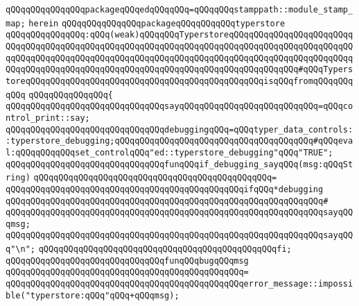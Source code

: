 \verb|qQQqqQQqqQQqqQQqpackageqQQqedqQQqqQQq=qQQqqQQqstamppath::module_stamp_map;|\newline
\verb|herein|\newline
\newline
\newline
\verb|qQQqqQQqqQQqqQQqpackageqQQqqQQqqQQqtyperstore|\newline
\verb|qQQqqQQqqQQqqQQq:qQQq(weak)qQQqqQQqTyperstoreqQQqqQQqqQQqqQQqqQQqqQQqqQQqqQQqqQQqqQQqqQQqqQQqqQQqqQQqqQQqqQQqqQQqqQQqqQQqqQQqqQQqqQQqqQQqqQQqqQQqqQQqqQQqqQQqqQQqqQQqqQQqqQQqqQQqqQQqqQQqqQQqqQQqqQQqqQQqqQQqqQQqqQQqqQQqqQQqqQQqqQQqqQQqqQQqqQQqqQQqqQQqqQQqqQQqqQQqqQQqqQQq#qQQqTyperstoreqQQqqQQqqQQqqQQqqQQqqQQqqQQqqQQqqQQqqQQqqQQqqQQqisqQQqfromqQQqqQQqqQQq|\newline
\verb|qQQqqQQqqQQqqQQq{|\newline
\verb|qQQqqQQqqQQqqQQqqQQqqQQqqQQqqQQqsayqQQqqQQqqQQqqQQqqQQqqQQqqQQq=qQQqcontrol_print::say;|\newline
\verb|qQQqqQQqqQQqqQQqqQQqqQQqqQQqqQQqdebuggingqQQq=qQQqtyper_data_controls::typerstore_debugging;qQQqqQQqqQQqqQQqqQQqqQQqqQQqqQQqqQQqqQQq#qQQqeval:qQQqqQQqqQQqset_controlqQQq"ed::typerstore_debugging"qQQq"TRUE";|\newline
\newline
\verb|qQQqqQQqqQQqqQQqqQQqqQQqqQQqqQQqfunqQQqif_debugging_sayqQQq(msg:qQQqString)|\newline
\verb|qQQqqQQqqQQqqQQqqQQqqQQqqQQqqQQqqQQqqQQqqQQqqQQq=|\newline
\verb|qQQqqQQqqQQqqQQqqQQqqQQqqQQqqQQqqQQqqQQqqQQqqQQqifqQQq*debugging|\newline
\verb|qQQqqQQqqQQqqQQqqQQqqQQqqQQqqQQqqQQqqQQqqQQqqQQqqQQqqQQqqQQqqQQq#|\newline
\verb|qQQqqQQqqQQqqQQqqQQqqQQqqQQqqQQqqQQqqQQqqQQqqQQqqQQqqQQqqQQqqQQqsayqQQqmsg;|\newline
\verb|qQQqqQQqqQQqqQQqqQQqqQQqqQQqqQQqqQQqqQQqqQQqqQQqqQQqqQQqqQQqqQQqsayqQQq"\n";|\newline
\verb|qQQqqQQqqQQqqQQqqQQqqQQqqQQqqQQqqQQqqQQqqQQqqQQqfi;|\newline
\newline
\verb|qQQqqQQqqQQqqQQqqQQqqQQqqQQqqQQqfunqQQqbugqQQqmsg|\newline
\verb|qQQqqQQqqQQqqQQqqQQqqQQqqQQqqQQqqQQqqQQqqQQqqQQq=|\newline
\verb|qQQqqQQqqQQqqQQqqQQqqQQqqQQqqQQqqQQqqQQqqQQqqQQqerror_message::impossible("typerstore:qQQq"qQQq+qQQqmsg);|\newline
